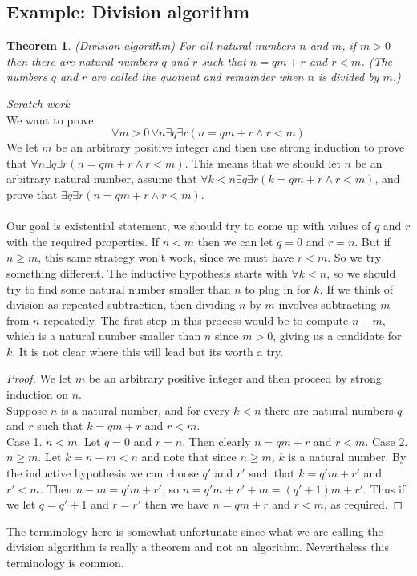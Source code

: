 \documentclass{report}
\newtheorem*{theorem}{Theorem}
\theoremstyle{definition}
\begin{document}
\subsection{Example: Division algorithm}
\begin{theorem}
(Division algorithm) For all natural numbers $n$ and $m$, if $m>0$ then there are natural numbers $q$ and $r$ such that $n=qm+r$ and $r<m$. (The numbers $q$ and $r$ are called the quotient
and remainder when $n$ is divided by $m$.)
\end{theorem}
\noindent\textit{Scratch work}\\
We want to prove
\begin{equation*}
\forall m>0\,\forall n\exists q\exists r(n=qm+r\land r<m)
\end{equation*}
We let $m$ be an arbitrary positive integer and then use strong induction to prove that 
$\forall n\exists q\exists r(n=qm+r\land r<m)$. This means that we should
let $n$ be an arbitrary natural number, assume that $\forall k<n\exists q\exists r(k=qm+r\land r<m)$, and prove that 
$\exists q\exists r(n=qm+r\land r<m)$.\\
\vspace{1mm}\\
Our goal is existential statement, we should try to come up with values of $q$ and $r$ with the required properties. If $n<m$ then we can let $q=0$ and $r=n$. But if $n\geq m$, this same strategy 
won't work, since we must have $r<m$. So we try something different. The inductive hypothesis starts with $\forall k<n$, so we should try to find some natural number smaller
than $n$ to plug in for $k$. If we think of division as repeated subtraction, then dividing $n$ by $m$ involves subtracting $m$ from $n$ repeatedly. The first step in this process would be to 
compute $n-m$, which is a natural number smaller than $n$ since $m>0$, giving us a candidate for $k$. It is not clear where this will lead but its worth a try. 
\begin{proof}
We let $m$ be an arbitrary positive integer and then proceed by strong induction on $n$.\\
\indent Suppose $n$ is a natural number, and for every $k<n$ there are natural numbers $q$ and $r$ such that $k=qm+r$ and $r<m$.\\
\indent Case 1. $n<m$. Let $q=0$ and $r=n$. Then clearly $n=qm+r$ and $r<m$.
\indent Case 2. $n\geq m$. Let $k=n-m<n$ and note that since $n\geq m$, $k$ is a natural number.
By the inductive hypothesis we can choose $q'$ and $r'$ such that $k=q'm+r'$ and $r'<m$. Then 
$n-m=q'm+r'$, so $n=q'm+r'+m=(q'+1)m+r'$. Thus if we let $q=q'+1$ and $r=r'$ then we have $n=qm+r$ and $r<m$, as required.
\end{proof}
\noindent The terminology here is somewhat unfortunate since what we are calling the division algorithm is really a theorem and not an algorithm. Nevertheless this terminology is common.
\newpage
\end{document}
